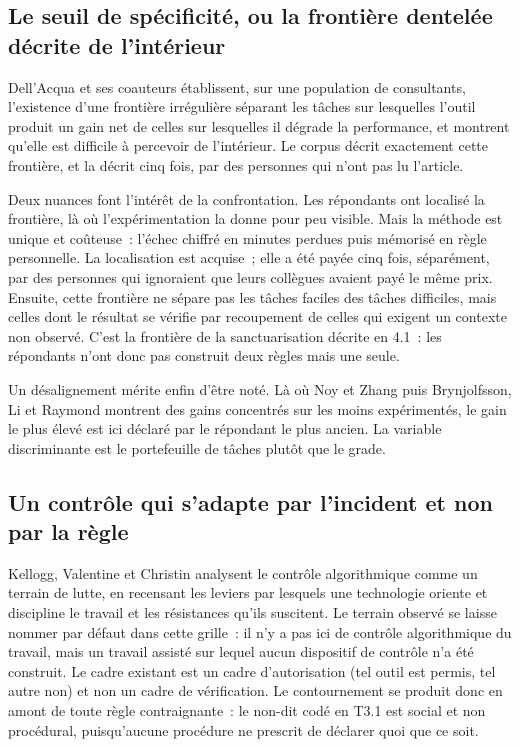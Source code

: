 \subsection{Le seuil de spécificité, ou la frontière dentelée décrite de l'intérieur}

Dell'Acqua et ses coauteurs \cite{dellacqua2026} établissent, sur une population de
consultants, l'existence d'une frontière irrégulière séparant les tâches sur lesquelles
l'outil produit un gain net de celles sur lesquelles il dégrade la performance, et montrent
qu'elle est difficile à percevoir de l'intérieur. Le corpus décrit exactement cette
frontière, et la décrit cinq fois, par des personnes qui n'ont pas lu l'article.

Deux nuances font l'intérêt de la confrontation. Les répondants ont localisé la frontière, là
où l'expérimentation la donne pour peu visible. Mais la méthode est unique et coûteuse~:
l'échec chiffré en minutes perdues puis mémorisé en règle personnelle. La localisation est
acquise~; elle a été payée cinq fois, séparément, par des personnes qui ignoraient que leurs
collègues avaient payé le même prix. Ensuite, cette frontière ne sépare pas les tâches faciles
des tâches difficiles, mais celles dont le résultat se vérifie par recoupement de celles qui
exigent un contexte non observé. C'est la frontière de la sanctuarisation décrite en 4.1~:
les répondants n'ont donc pas construit deux règles mais une seule.

Un désalignement mérite enfin d'être noté. Là où Noy et Zhang \cite{noy2023} puis
\mbox{Brynjolfsson}, Li et Raymond \cite{brynjolfsson2025} montrent des gains concentrés sur les
moins expérimentés, le gain le plus élevé est ici déclaré par le répondant le plus ancien. La
variable discriminante est le portefeuille de tâches plutôt que le grade.

\subsection{Un contrôle qui s'adapte par l'incident et non par la règle}

Kellogg, Valentine et Christin \cite{kellogg2020} analysent le contrôle algorithmique comme un
terrain de lutte, en recensant les leviers par lesquels une technologie oriente et discipline
le travail et les résistances qu'ils suscitent. Le terrain observé se laisse nommer par défaut
dans cette grille~: il n'y a pas ici de contrôle algorithmique du travail, mais un travail
assisté sur lequel aucun dispositif de contrôle n'a été construit. Le cadre existant est un
cadre d'autorisation (tel outil est permis, tel autre non) et non un cadre de
vérification. Le contournement se produit donc en amont de toute règle contraignante~: le
non-dit codé en T3.1 est social et non procédural, puisqu'aucune procédure ne prescrit de
déclarer quoi que ce soit.

